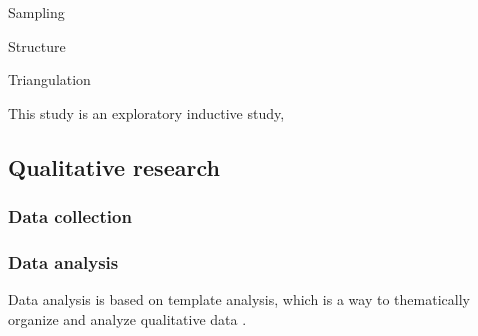 Sampling

Structure \cite{eisenhardt1989building}

Triangulation

This study is an exploratory inductive study, 

\subsection{Qualitative research}




\subsubsection{Data collection}



\subsubsection{Data analysis}

Data analysis is based on template analysis, which is a way to thematically organize and analyze qualitative data \cite{king1998template}. 


